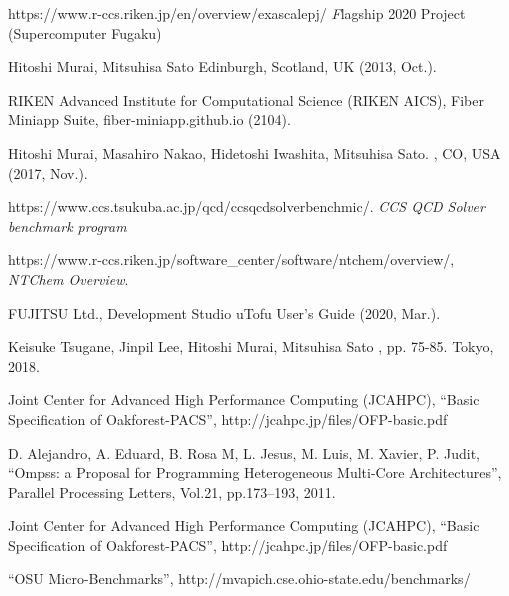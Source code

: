 ﻿\documentclass[graybox]{svmult}
\begin{document}
\begin{thebibliography}{10}

  https://www.r-ccs.riken.jp/en/overview/exascalepj/
{\emph  Flagship 2020 Project (Supercomputer Fugaku)}

Hitoshi Murai, Mitsuhisa Sato
Edinburgh, Scotland, UK (2013, Oct.).

RIKEN Advanced Institute for Computational Science (RIKEN AICS), Fiber
Miniapp Suite, fiber-miniapp.github.io (2104).

 Hitoshi Murai, Masahiro Nakao, Hidetoshi Iwashita, Mitsuhisa Sato. 
, CO, USA
(2017, Nov.).

 https://www.ccs.tsukuba.ac.jp/qcd/ccsqcdsolverbenchmic/.
\emph{CCS QCD Solver benchmark program}

  https://www.r-ccs.riken.jp/software\_center/software/ntchem/overview/,
\emph{NTChem Overview}.  

FUJITSU Ltd., Development Studio uTofu User's Guide (2020, Mar.).

  Keisuke Tsugane, Jinpil Lee, Hitoshi Murai, Mitsuhisa Sato
  , pp. 75-85. Tokyo, 2018.


Joint Center for Advanced High Performance Computing (JCAHPC), ``Basic Specification of Oakforest-PACS'', http:{\slash}{\slash}jcahpc.jp{\slash}files{\slash}OFP-basic.pdf

 D. Alejandro, A. Eduard, B. Rosa M, L. Jesus, M. Luis,
  M. Xavier, P. Judit, ``Ompss: a Proposal for Programming
  Heterogeneous Multi-Core Architectures'', Parallel Processing
  Letters, Vol.21, pp.173--193, 2011.

Joint Center for Advanced High Performance Computing (JCAHPC), ``Basic Specification of Oakforest-PACS'', http:{\slash}{\slash}jcahpc.jp{\slash}files{\slash}OFP-basic.pdf

``OSU Micro-Benchmarks'', http:{\slash}{\slash}mvapich.cse.ohio-state.edu{\slash}benchmarks/


\end{thebibliography}
\end{document}
